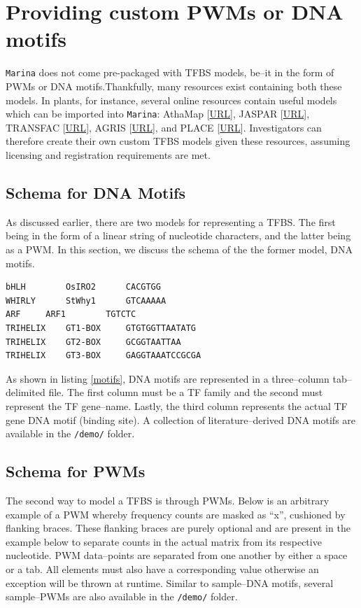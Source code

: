 \documentclass{article}
\begin{document}
\section{Providing custom PWMs or DNA motifs}
\label{section:custom}
\texttt{Marina} does not come pre-packaged with TFBS models, be--it in the form of
PWMs or DNA motifs.Thankfully, many resources exist containing both these models.
In plants, for instance, several online resources contain useful models which can be imported into 
\texttt{Marina}: AthaMap [\href{http://www.athamap.de/}{URL}], 
JASPAR [\href{http://jaspar.genereg.net/}{URL}], 
TRANSFAC [\href{http://www.gene-regulation.com/pub/databases.html}{URL}],
AGRIS [\href{http://arabidopsis.med.ohio-state.edu/}{URL}], and
PLACE [\href{http://www.dna.affrc.go.jp/PLACE/}{URL}].
Investigators can therefore create their own custom TFBS models given these resources,
assuming licensing and registration requirements are met.

\subsection{Schema for DNA Motifs}
As discussed earlier, there are two models for representing a TFBS. The first being in
the form of a linear string of nucleotide characters, and the latter being as a PWM.
In this section, we discuss the schema of the the former model, DNA motifs.

\begin{lstlisting}[label={motifs},caption=Three-column DNA-motif schema.]
bHLH		OsIRO2		CACGTGG
WHIRLY		StWhy1		GTCAAAAA
ARF		ARF1		TGTCTC
TRIHELIX	GT1-BOX		GTGTGGTTAATATG
TRIHELIX	GT2-BOX		GCGGTAATTAA
TRIHELIX	GT3-BOX		GAGGTAAATCCGCGA
\end{lstlisting}

As shown in listing \ref{motifs}, DNA motifs are represented in a three--column
tab--delimited file. The first column must be a TF family and the second
must represent the TF gene--name. Lastly, the third column represents the actual
TF gene DNA motif (binding site). A collection of literature--derived DNA motifs
are available in the \texttt{/demo/} folder.

\subsection{Schema for PWMs}
\label{section:pwm_schema}
The second way to model a TFBS is through PWMs. Below is an arbitrary example
of a PWM whereby frequency counts are masked as ``x'', cushioned by flanking
braces. These flanking braces are purely optional and are present in the
example below to separate counts in the actual matrix from its respective
nucleotide. PWM data--points are separated from one another by either a 
space or a tab. All elements must also have a corresponding value otherwise
an exception will be thrown at runtime. Similar to sample--DNA motifs, several
sample--PWMs are also available in the \texttt{/demo/} folder.
\end{document}
